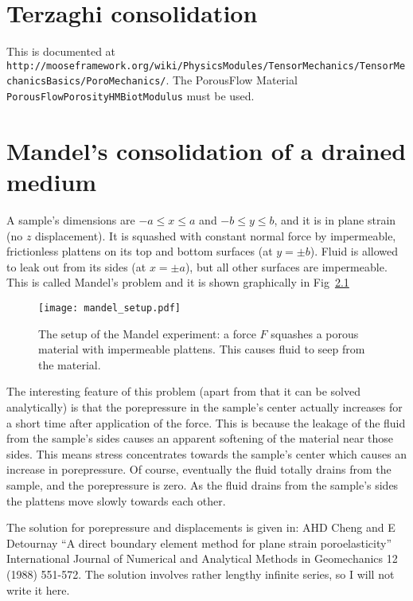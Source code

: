\documentclass[]{scrreprt}
\begin{document}
\chapter{Terzaghi consolidation}

This is documented at {\tt
  http://mooseframework.org/wiki/PhysicsModules/TensorMechanics/TensorMechanicsBasics/PoroMechanics/}.
The PorousFlow Material {\tt PorousFlowPorosityHMBiotModulus} must be used.

\chapter{Mandel's consolidation of a drained medium}

A sample's dimensions are $-a \leq x \leq a$ and $-b \leq y \leq b$,
and it is in plane strain (no $z$ displacement).  It is squashed with
constant normal force by impermeable, frictionless plattens on its top
and bottom surfaces (at $y = \pm b$).  Fluid is allowed to leak out
from its sides (at $x = \pm a$), but all other surfaces are
impermeable.  This is called Mandel's problem and it is shown
graphically in Fig~\ref{mandel_setup.fig}

\begin{figure}[htb]
\begin{center}
\texttt{[image: mandel\_setup.pdf]}
\caption{The setup of the Mandel experiment: a force $F$ squashes a
  porous material with impermeable plattens.  This causes fluid to
  seep from the material.}
\label{mandel_setup.fig}
\end{center}
\end{figure}

The interesting feature of this problem (apart from that it can be
solved analytically) is that the porepressure in the sample's center
actually increases for a short time after application of the force.
This is because the leakage of the fluid from the sample's sides
causes an apparent softening of the material near those sides.  This
means stress concentrates towards the sample's center which causes an
increase in porepressure.  Of course, eventually the fluid totally
drains from the sample, and the porepressure is zero.  As the fluid
drains from the sample's sides the plattens move slowly towards each
other.

The solution for porepressure and displacements is given in: AHD Cheng
and E Detournay ``A direct boundary element method for plane strain
poroelasticity'' International Journal of Numerical and Analytical
Methods in Geomechanics 12 (1988) 551-572.  The solution involves
rather lengthy infinite series, so I will not write it here.
\end{document}
